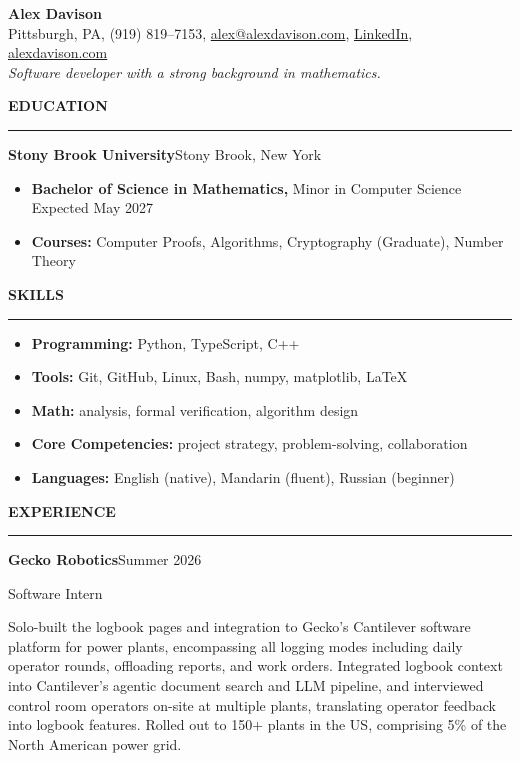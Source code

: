 \documentclass[10pt,letterpaper]{article}
\newcommand{\ressection}[1]{%
  \par\addvspace{7pt}%
  {\large\bfseries #1}\par\nobreak
  \vspace{2pt}\noindent\rule{\linewidth}{1pt}\par\nobreak
  \vspace{2pt}%
}
\newcommand{\entry}[2]{%
  \par\addvspace{2pt}%
  \noindent\textbf{#1}\hfill #2\par\nobreak
}
\newcommand{\subentry}[2]{%
  \noindent #1\hfill #2\par
}
\newcommand{\entrydesc}[1]{%
  \par\addvspace{1pt}%
  \noindent #1\par
}
\begin{document}
\begin{center}
  {\fontsize{18}{21}\selectfont\bfseries Alex Davison}\\[3pt]
  {\footnotesize Pittsburgh, PA, (919) 819--7153, \href{mailto:alex@alexdavison.com}{alex@alexdavison.com}, \href{https://www.linkedin.com/in/alexander-davison-62086127b/}{LinkedIn}, \href{https://alexdavison.com/}{alexdavison.com}}\\[3pt]
  {\small\itshape Software developer with a strong background in mathematics.}
\end{center}

\ressection{EDUCATION}

\entry{Stony Brook University}{Stony Brook, New York}
\begin{itemize}
  \item \textbf{Bachelor of Science in Mathematics,} Minor in Computer Science \hfill Expected May 2027
  \item \textbf{Courses:} Computer Proofs, Algorithms, Cryptography (Graduate), Number Theory
\end{itemize}

\ressection{SKILLS}

\begin{itemize}
  \item \textbf{Programming:} Python, TypeScript, C++
  \item \textbf{Tools:} Git, GitHub, Linux, Bash, numpy, matplotlib, \LaTeX
  \item \textbf{Math:} analysis, formal verification, algorithm design
  \item \textbf{Core Competencies:} project strategy, problem-solving, collaboration
  \item \textbf{Languages:} English (native), Mandarin (fluent), Russian (beginner)
\end{itemize}

\ressection{EXPERIENCE}

\entry{Gecko Robotics}{Summer 2026}
\subentry{Software Intern}{}
\entrydesc{Solo-built the logbook pages and integration to Gecko's Cantilever software platform for power plants, encompassing all logging modes including daily operator rounds, offloading reports, and work orders. Integrated logbook context into Cantilever's agentic document search and LLM pipeline, and interviewed control room operators on-site at multiple plants, translating operator feedback into logbook features. Rolled out to 150+ plants in the US, comprising 5\% of the North American power grid.}
\end{document}
